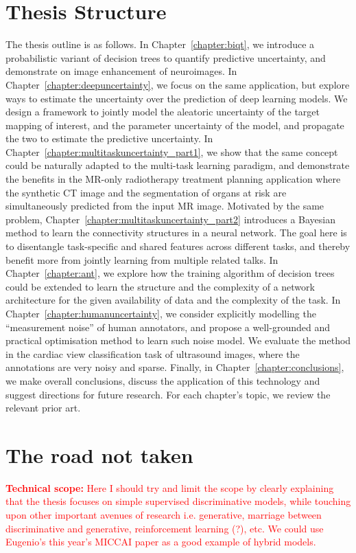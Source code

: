 \section{Thesis Structure}
The thesis outline is as follows. In Chapter~\ref{chapter:biqt}, we introduce a probabilistic variant of decision trees to quantify predictive uncertainty, and demonstrate on image enhancement of neuroimages. In Chapter~\ref{chapter:deepuncertainty}, we focus on the same application, but explore ways to estimate the uncertainty over the prediction of deep learning models. We design a framework to jointly model the aleatoric uncertainty of the target mapping of interest, and the parameter uncertainty of the model, and propagate the two to estimate the predictive uncertainty. In Chapter~\ref{chapter:multitaskuncertainty_part1}, we show that the same concept could be naturally adapted to the multi-task learning paradigm, and demonstrate the benefits in the MR-only radiotherapy treatment planning application where the synthetic CT image and the segmentation of organs at risk are simultaneously predicted from the input MR image. Motivated by the same problem, Chapter~\ref{chapter:multitaskuncertainty_part2} introduces a Bayesian method to learn the connectivity structures in a neural network. The goal here is to disentangle task-specific and shared features across different tasks, and thereby benefit more from jointly learning from multiple related talks. In Chapter~\ref{chapter:ant}, we explore how the training algorithm of decision trees could be extended to learn the structure and the complexity of a network architecture for the given availability of data and the complexity of the task. In Chapter~\ref{chapter:humanuncertainty}, we consider explicitly modelling the ``measurement noise'' of human annotators, and propose a well-grounded and practical optimisation method to learn such noise model. We evaluate the method in the cardiac view classification task of ultrasound images, where the annotations are very noisy and sparse. Finally, in Chapter~\ref{chapter:conclusions}, we make overall conclusions, discuss the application of this technology and suggest directions for future research. For each chapter’s topic, we review the relevant prior art. 

\section{The road not taken}
\textcolor{red}{\textbf{Technical scope:} Here I should try and limit the scope by clearly explaining that the thesis focuses on simple supervised discriminative models, while touching upon other important avenues of research i.e.  generative, marriage between discriminative and generative, reinforcement learning (?), etc. We could use Eugenio's this year's MICCAI paper as a good example of hybrid models. }

